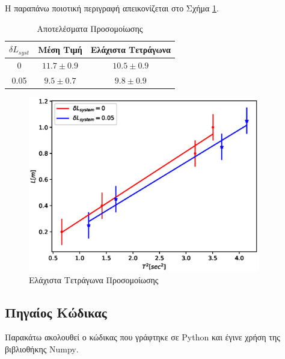 \documentclass[assignment1.tex]{subfiles}
\begin{document}
Η παραπάνω ποιοτική περιγραφή απεικονίζεται στο Σχήμα \ref{fig:least_squares}.

\begin{table}[ht]
\centering
\begin{tabular}{||c c c||} 
 \hline
 $\delta L_{syst}$& Μέση Τιμή & Ελάχιστα Τετράγωνα \\ [0.5ex] 
 \hline\hline
 0 & $11.7\pm 0.9$ & $10.5 \pm 0.9$ \\ 
 0.05 & $9.5\pm 0.7$ & $9.8 \pm 0.9$ \\ [1ex] 
 \hline
\end{tabular}
\caption{Αποτελέσματα Προσομοίωσης}
\label{table:results}
\end{table}

\begin{figure}[hp]
\includegraphics[width=0.9\textwidth]{experiment.eps}
\centering
\caption{Ελάχιστα Τετράγωνα Προσομοίωσης}
\label{fig:least_squares}
\end{figure} 

\FloatBarrier

\subsection*{Πηγαίος Κώδικας}

Παρακάτω ακολουθεί ο κώδικας που γράφτηκε σε \textlatin{Python} και έγινε χρήση της βιβλιοθήκης \textlatin{Numpy}.


\end{document}
